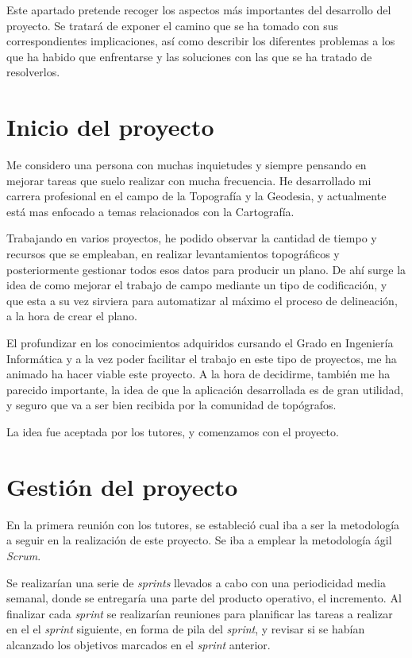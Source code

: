 
Este apartado pretende recoger los aspectos más importantes del desarrollo del proyecto. Se tratará de exponer el camino que se ha tomado con sus correspondientes implicaciones, así como describir los diferentes problemas a
los que ha habido que enfrentarse y las soluciones con las que se ha tratado de resolverlos.

\section{Inicio del proyecto}

Me considero una persona con muchas inquietudes y siempre pensando en mejorar tareas que suelo realizar con mucha frecuencia. He desarrollado mi carrera profesional en el campo de la Topografía y la Geodesia, y actualmente está mas enfocado a temas relacionados con la Cartografía.

Trabajando en varios proyectos, he podido observar la cantidad de tiempo y recursos que se empleaban, en realizar levantamientos topográficos y posteriormente gestionar todos esos datos para producir un plano. De ahí surge la idea de como mejorar el trabajo de campo mediante un tipo de codificación,  y que esta a su vez sirviera para automatizar al máximo el proceso de delineación, a la hora de  crear el plano.

El profundizar en los conocimientos adquiridos cursando el Grado en Ingeniería Informática y a la vez poder facilitar el trabajo en este tipo de proyectos, me ha animado ha hacer viable este proyecto. A la hora de decidirme, también me ha parecido importante, la idea de que la aplicación desarrollada es de gran utilidad, y seguro que va a ser bien recibida por la comunidad de topógrafos.

La idea fue aceptada por los tutores, y comenzamos con el proyecto.


\section{Gestión del proyecto}

En la primera reunión con los tutores, se estableció cual iba a ser la metodología a seguir en la realización de este proyecto. Se iba a emplear la metodología ágil \emph{Scrum}.

Se realizarían una serie de \emph{sprints} llevados a cabo con una periodicidad media semanal, donde se entregaría una parte del producto operativo, el incremento. Al finalizar cada \emph{sprint} se realizarían reuniones para planificar las tareas a realizar en el el \emph{sprint} siguiente, en forma de pila del \emph{sprint}, y revisar si se habían alcanzado los objetivos marcados en el \emph{sprint} anterior.

